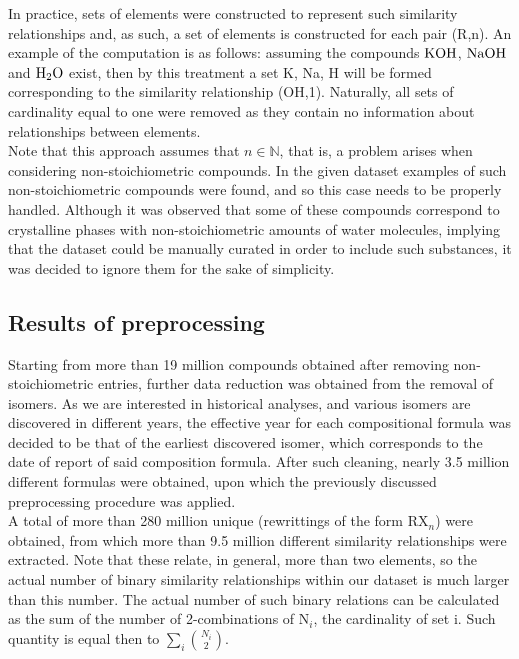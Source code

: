 \documentclass[article]{article}
\begin{document}
In practice, sets of elements were constructed to represent such similarity relationships and, as such, a set of elements is constructed for each pair (R,n). An example of the computation is as follows: assuming the compounds $\ce{KOH}$, $\ce{NaOH}$ and $\ce{H2O}$ exist, then by this treatment a set {K, Na, H} will be formed corresponding to the similarity relationship (OH,1). Naturally, all sets of cardinality equal to one were removed as they contain no information about relationships between elements.\\

Note that this approach assumes that $n \in \mathbb{N}$, that is, a problem arises when considering non-stoichiometric compounds. In the given dataset examples of such non-stoichiometric compounds were found, and so this case needs to be properly handled. Although it was observed that some of these compounds correspond to crystalline phases with non-stoichiometric amounts of water molecules, implying that the dataset could be manually curated in order to include such substances, it was decided to ignore them for the sake of simplicity. \\

\subsection{Results of preprocessing}
Starting from more than 19 million compounds obtained after removing non-stoichiometric entries, further data reduction was obtained from the removal of isomers. As we are interested in historical analyses, and various isomers are discovered in different years, the effective year for each compositional formula was decided to be that of the earliest discovered isomer, which corresponds to the date of report of said composition formula. After such cleaning, nearly 3.5 million different formulas were obtained, upon which the previously discussed preprocessing procedure was applied.\\

A total of more than 280 million unique  (rewrittings of the form RX$_n$) were obtained, from which more than 9.5 million different similarity relationships were extracted. Note that these  relate, in general, more than two elements, so the actual number of binary similarity relationships within our dataset is much larger than this number. The actual number of such binary relations can be calculated as the sum of the number of 2-combinations of N$_i$, the cardinality of set i. Such quantity is equal then to $\sum_i \binom{N_i}{2}$.\\
\end{document}
